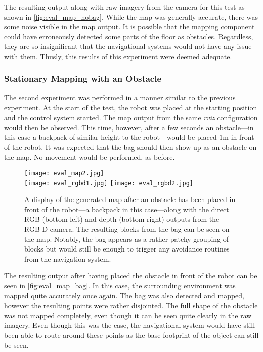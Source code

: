 The resulting output along with raw imagery from the camera for this test as shown in \autoref{fig:eval_map_nobag}. While the map was generally accurate, there was some noise visible in the map output. It is possible that the mapping component could have erroneously detected some parts of the floor as obstacles. Regardless, they are so insignificant that the navigational systems would not have any issue with them. Thusly, this results of this experiment were deemed adequate.

\subsubsection{Stationary Mapping with an Obstacle}

The second experiment was performed in a manner similar to the previous experiment. At the start of the test, the robot was placed at the starting position and the control system started. The map output from the same \emph{rviz} configuration would then be observed. This time, however, after a few seconds an obstacle---in this case a backpack of similar height to the robot---would be placed $1$m in front of the robot. It was expected that the bag should then show up as an obstacle on the map. No movement would be performed, as before.

\begin{figure}[h]
	\centering
	\texttt{[image: eval\_map2.jpg]} \\
	\vspace{2pt}
	\texttt{[image: eval\_rgbd1.jpg]}
	\texttt{[image: eval\_rgbd2.jpg]}
	\caption{A display of the generated map after an obstacle has been placed in front of the robot---a backpack in this case---along with the direct RGB (bottom left) and depth (bottom right) outputs from the RGB-D camera. The resulting blocks from the bag can be seen on the map. Notably, the bag appears as a rather patchy grouping of blocks but would still be enough to trigger any avoidance routines from the navigation system.}
	\label{fig:eval_map_bag}
\end{figure}

The resulting output after having placed the obstacle in front of the robot can be seen in \autoref{fig:eval_map_bag}. In this case, the surrounding environment was mapped quite accurately once again. The bag was also detected and mapped, however the resulting points were rather disjointed. The full shape of the obstacle was not mapped completely, even though it can be seen quite clearly in the raw imagery. Even though this was the case, the navigational system would have still been able to route around these points as the base footprint of the object can still be seen.

